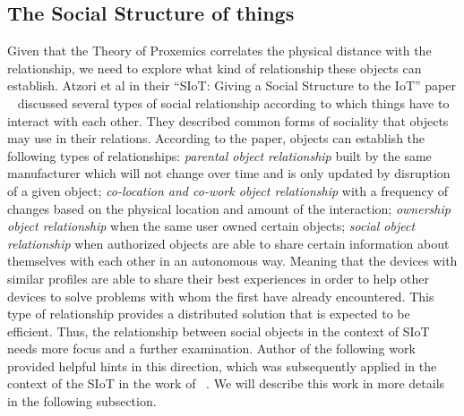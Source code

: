 \subsection{The Social Structure of things}
\label{sec:The Social Structure of things}
Given that the Theory of Proxemics correlates the physical distance with the relationship, we need to explore what kind of relationship these objects can establish. Atzori et al in their “SIoT: Giving a Social Structure to the IoT” paper ~\cite{atzori2011siot} discussed several types of social relationship according to which things have to interact with each other. They described common forms of sociality that objects may use in their relations. According to the paper, objects can establish the following types of relationships: \textit{parental object relationship} built by the same manufacturer which will not change over time and is only updated by disruption of a given object; \textit{co-location and co-work object relationship} with a frequency of changes based on the physical location and amount of the interaction; \textit{ownership object relationship} when the same user owned certain objects; \textit{social object relationship} when authorized objects are able to share certain information about themselves with each other in an autonomous way. Meaning that the devices with similar profiles are able to share their best experiences in order to help other devices to solve problems with whom the first have already encountered. This type of relationship provides a distributed solution that is expected to be efficient. Thus, the relationship between social objects in the context of SIoT needs more focus and a further examination. Author of the following work ~\cite{fiske1992four} provided helpful hints in this direction, which was subsequently applied in the context of the SIoT in the work of ~\cite{pintus2015humanizing}. We will describe this work in more details in the following subsection.

